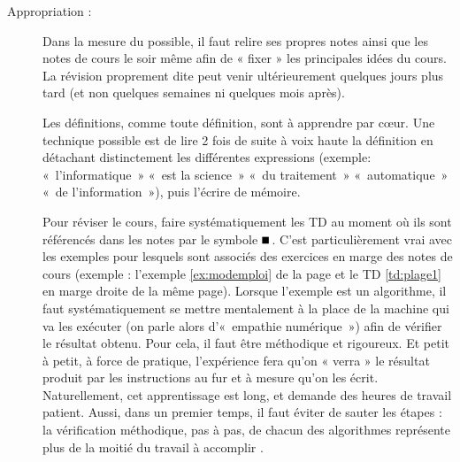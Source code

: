 \begin{description}
\item[Appropriation :] Dans la mesure du possible, il faut relire ses propres notes 
	ainsi que les notes de cours le soir même afin de « fixer » les principales
	idées du cours. La révision proprement dite peut venir ultérieurement
	quelques jours plus tard (et non quelques semaines ni quelques mois après).
	
	Les définitions, comme toute définition, sont à apprendre par c\oe ur.
	Une technique possible est de lire 2 fois de suite à voix haute la définition
	en détachant distinctement les différentes expressions (exemple: «~l'informatique~»
	«~est la science~» «~du traitement~» «~automatique~» «~de l'information~»),
	puis l'écrire de mémoire.
	
	Pour réviser le cours, faire systématiquement les TD au moment où ils sont
	référencés dans les notes par le symbole $\rule{2mm}{2mm}\,$. 
	C'est particulièrement vrai 
	avec les exemples pour lesquels sont associés des exercices en marge des
	notes de cours
	(exemple : l'exemple \ref{ex:modemploi} de la page \pageref{ex:modemploi}
	et le TD \ref {td:plage1} en marge droite de la même page).
	Lorsque l'exemple est un algorithme, il faut  systématiquement se mettre 
	mentalement à la place de la machine qui va les exécuter (on parle alors 
	d'«~empathie numérique~») afin de vérifier le résultat obtenu. 
	Pour cela, il faut être méthodique et rigoureux. 
	Et petit à petit, à force de pratique, l'expérience fera qu'on « verra » 
	le résultat produit par les instructions au fur et à mesure qu'on les écrit. 
	Naturellement, cet apprentissage est long, et demande des heures de travail 
	patient. Aussi, dans un premier temps, il faut éviter de sauter les étapes : 
	la vérification méthodique, pas à pas, de chacun des algorithmes 
	représente plus de la moitié du travail à accomplir \cite{darmengeat}.
\end{description}

